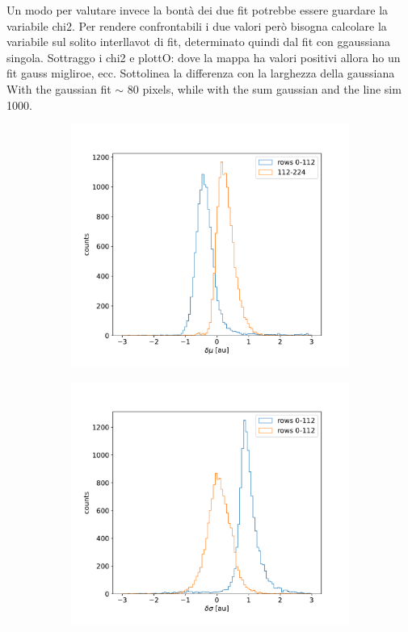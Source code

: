         Un modo per valutare invece la bontà dei due fit potrebbe essere guardare la variabile chi2. Per rendere confrontabili i due valori però  bisogna calcolare la variabile sul solito interllavot di fit, determinato quindi dal fit con ggaussiana singola. 
        Sottraggo i chi2 e plottO: dove la mappa ha valori positivi allora ho un fit gauss migliroe, ecc. Sottolinea la differenza con la larghezza della gaussiana
        With the gaussian fit $\sim$ 80 pixels, while with the sum gaussian and the line sim 1000. 
        \begin{figure}[h!]
            \begin{subfigure}{.5\textwidth}
            \centering
            \includegraphics[width=.99\linewidth]{figures/charaterization/deltam_Fe.pdf}
            \label{fig:}
            \end{subfigure}
            \begin{subfigure}{.5\textwidth}
            \centering
            \includegraphics[width=.99\linewidth]{figures/charaterization/deltas_Fe.pdf}

\end{subfigure}
\end{figure}
